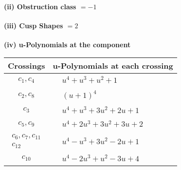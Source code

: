 \documentclass[1p]{elsarticle_modified}
\theoremstyle{definition}
\begin{document}
\flushleft \textbf{(ii) Obstruction class $= -1$}\\~\\
\flushleft \textbf{(iii) Cusp Shapes $= 2$}\\~\\
\newpage\renewcommand{\arraystretch}{1}
\flushleft \textbf{(iv) u-Polynomials at the component}\newline \\
\begin{tabular}{m{50pt}|m{274pt}}
Crossings & \hspace{64pt}u-Polynomials at each crossing \\
\hline $$\begin{aligned}c_{1},c_{4}\end{aligned}$$&$\begin{aligned}
&u^4+u^3+u^2+1
\end{aligned}$\\
\hline $$\begin{aligned}c_{2},c_{8}\end{aligned}$$&$\begin{aligned}
&(u+1)^4
\end{aligned}$\\
\hline $$\begin{aligned}c_{3}\end{aligned}$$&$\begin{aligned}
&u^4+u^3+3 u^2+2 u+1
\end{aligned}$\\
\hline $$\begin{aligned}c_{5},c_{9}\end{aligned}$$&$\begin{aligned}
&u^4+2 u^3+3 u^2+3 u+2
\end{aligned}$\\
\hline $$\begin{aligned}c_{6},c_{7},c_{11}\\c_{12}\end{aligned}$$&$\begin{aligned}
&u^4- u^3+3 u^2-2 u+1
\end{aligned}$\\
\hline $$\begin{aligned}c_{10}\end{aligned}$$&$\begin{aligned}
&u^4-2 u^3+u^2-3 u+4
\end{aligned}$\\
\hline
\end{tabular}\\~\\
\end{document}
